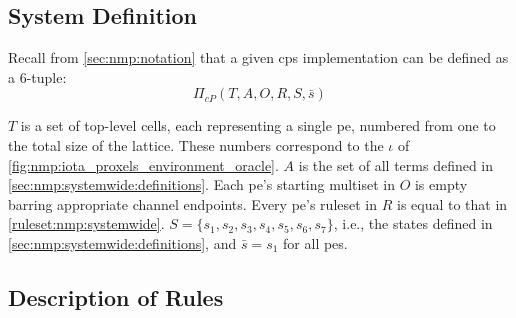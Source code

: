 \subsection{System Definition}
Recall from \autoref{sec:nmp:notation} that a given \gls{cps} implementation can be defined as a 6-tuple:
\[
\Pi_{cP}(T, A, O, R, S, \bar{s})
\]

\(T\) is a set of top-level cells, each representing a single \gls{pe}, numbered from one to the total size of the lattice.  These numbers correspond to the \(\iota\) of \autoref{fig:nmp:iota_proxels_environment_oracle}.  \(A\) is the set of all terms defined in \autoref{sec:nmp:systemwide:definitions}.  Each \gls{pe}'s starting multiset in \(O\) is empty barring appropriate channel endpoints.  Every \gls{pe}'s ruleset in \(R\) is equal to that in \autoref{ruleset:nmp:systemwide}.  \(S = \{s_1, s_2, s_3, s_4, s_5, s_6, s_7\}\), i.e., the states defined in \autoref{sec:nmp:systemwide:definitions}, and \(\bar{s} = s_1\) for all \glspl{pe}.

\subsection{Description of Rules}


